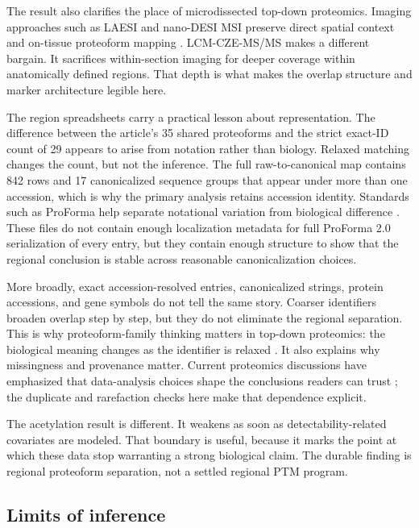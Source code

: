 The result also clarifies the place of microdissected top-down proteomics. Imaging approaches such as LAESI and nano-DESI MSI preserve direct spatial context and on-tissue proteoform mapping \citep{kiss2014laesi,yang2022nanodesi}. LCM-CZE-MS/MS makes a different bargain. It sacrifices within-section imaging for deeper coverage within anatomically defined regions. That depth is what makes the overlap structure and marker architecture legible here.

The region spreadsheets carry a practical lesson about representation. The difference between the article's 35 shared proteoforms and the strict exact-ID count of 29 appears to arise from notation rather than biology. Relaxed matching changes the count, but not the inference. The full raw-to-canonical map contains 842 rows and 17 canonicalized sequence groups that appear under more than one accession, which is why the primary analysis retains accession identity. Standards such as ProForma help separate notational variation from biological difference \citep{leduc2018proforma,leduc2022proforma2}. These files do not contain enough localization metadata for full ProForma 2.0 serialization of every entry, but they contain enough structure to show that the regional conclusion is stable across reasonable canonicalization choices.

More broadly, exact accession-resolved entries, canonicalized strings, protein accessions, and gene symbols do not tell the same story. Coarser identifiers broaden overlap step by step, but they do not eliminate the regional separation. This is why proteoform-family thinking matters in top-down proteomics: the biological meaning changes as the identifier is relaxed \citep{schaffer2018proteoformfamilies}. It also explains why missingness and provenance matter. Current proteomics discussions have emphasized that data-analysis choices shape the conclusions readers can trust \citep{vanderaa2023singlecell}; the duplicate and rarefaction checks here make that dependence explicit.

The acetylation result is different. It weakens as soon as detectability-related covariates are modeled. That boundary is useful, because it marks the point at which these data stop warranting a strong biological claim. The durable finding is regional proteoform separation, not a settled regional PTM program.

\subsection{Limits of inference}


